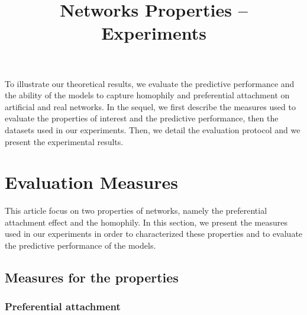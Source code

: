 \documentclass[a4paper, 12pt]{article}
\title{Networks Properties -- Experiments}
\begin{document}
\maketitle
\tableofcontents

To illustrate our theoretical results, we evaluate the predictive performance and the ability of the models to capture homophily and preferential attachment on artificial and real networks. In the sequel, we first describe the measures used to evaluate the properties of interest and the predictive performance, then the datasets used in our experiments. Then, we detail the evaluation protocol and we present the experimental results.

\section{Evaluation Measures}
This article focus on two properties of networks, namely the preferential attachment effect and the homophily. In this section, we present the measures used in our experiments in order to characterized these properties and to evaluate the predictive performance of the models.

\subsection{Measures for the properties}

\subsubsection{Preferential attachment}
\label{sec:experiments-burst}
\end{document}
